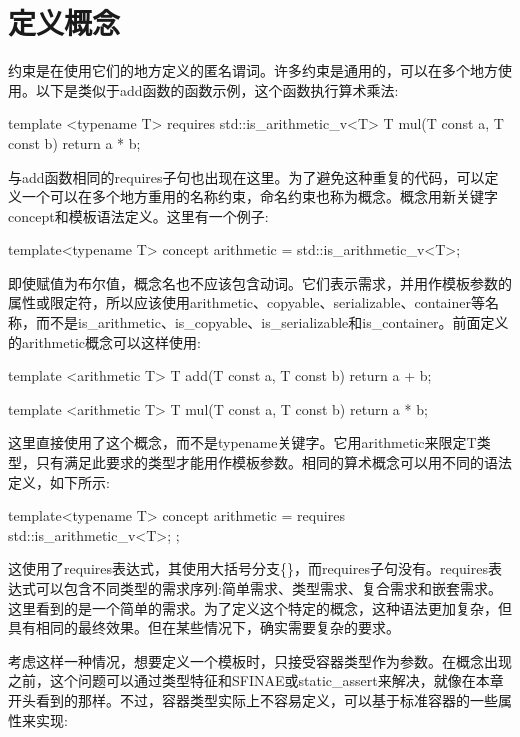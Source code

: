 \section{定义概念}
约束是在使用它们的地方定义的匿名谓词。许多约束是通用的，可以在多个地方使用。以下是类似于add函数的函数示例，这个函数执行算术乘法:

\begin{cpp}
template <typename T>
requires std::is_arithmetic_v<T>
T mul(T const a, T const b)
{
	return a * b;
}
\end{cpp}

与add函数相同的requires子句也出现在这里。为了避免这种重复的代码，可以定义一个可以在多个地方重用的名称约束，命名约束也称为概念。概念用新关键字concept和模板语法定义。这里有一个例子:

\begin{cpp}
template<typename T>
concept arithmetic = std::is_arithmetic_v<T>;
\end{cpp}

即使赋值为布尔值，概念名也不应该包含动词。它们表示需求，并用作模板参数的属性或限定符，所以应该使用arithmetic、copyable、serializable、container等名称，而不是is\_arithmetic、is\_copyable、is\_serializable和is\_container。前面定义的arithmetic概念可以这样使用:

\begin{cpp}
template <arithmetic T>
T add(T const a, T const b) { return a + b; }

template <arithmetic T>
T mul(T const a, T const b) { return a * b; }
\end{cpp}

这里直接使用了这个概念，而不是typename关键字。它用arithmetic来限定T类型，只有满足此要求的类型才能用作模板参数。相同的算术概念可以用不同的语法定义，如下所示:

\begin{cpp}
template<typename T>
concept arithmetic = requires { std::is_arithmetic_v<T>; };
\end{cpp}

这使用了requires表达式，其使用大括号分支\{\}，而requires子句没有。requires表达式可以包含不同类型的需求序列:简单需求、类型需求、复合需求和嵌套需求。这里看到的是一个简单的需求。为了定义这个特定的概念，这种语法更加复杂，但具有相同的最终效果。但在某些情况下，确实需要复杂的要求。

考虑这样一种情况，想要定义一个模板时，只接受容器类型作为参数。在概念出现之前，这个问题可以通过类型特征和SFINAE或static\_assert来解决，就像在本章开头看到的那样。不过，容器类型实际上不容易定义，可以基于标准容器的一些属性来实现:

